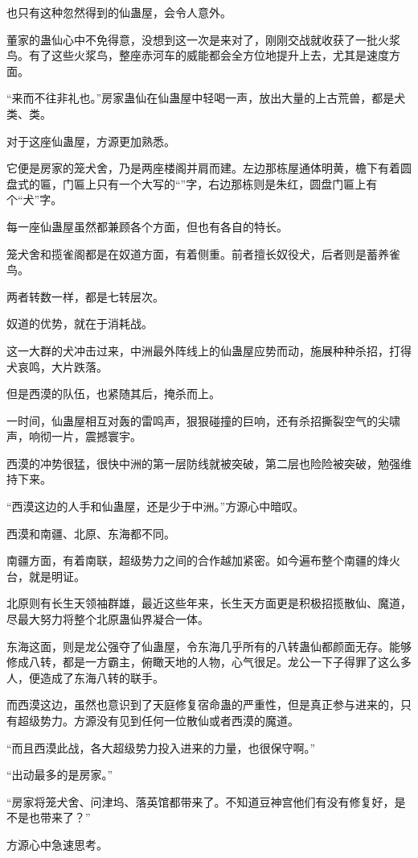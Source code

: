 \begin{this_body}
也只有这种忽然得到的仙蛊屋，会令人意外。

董家的蛊仙心中不免得意，没想到这一次是来对了，刚刚交战就收获了一批火浆鸟。有了这些火浆鸟，整座赤河车的威能都会全方位地提升上去，尤其是速度方面。

“来而不往非礼也。”房家蛊仙在仙蛊屋中轻喝一声，放出大量的上古荒兽，都是犬类、类。

对于这座仙蛊屋，方源更加熟悉。

它便是房家的笼犬舍，乃是两座楼阁并肩而建。左边那栋屋通体明黄，檐下有着圆盘式的匾，门匾上只有一个大写的“”字，右边那栋则是朱红，圆盘门匾上有个“犬”字。

每一座仙蛊屋虽然都兼顾各个方面，但也有各自的特长。

笼犬舍和揽雀阁都是在奴道方面，有着侧重。前者擅长奴役犬，后者则是蓄养雀鸟。

两者转数一样，都是七转层次。

奴道的优势，就在于消耗战。

这一大群的犬冲击过来，中洲最外阵线上的仙蛊屋应势而动，施展种种杀招，打得犬哀鸣，大片跌落。

但是西漠的队伍，也紧随其后，掩杀而上。

一时间，仙蛊屋相互对轰的雷鸣声，狠狠碰撞的巨响，还有杀招撕裂空气的尖啸声，响彻一片，震撼寰宇。

西漠的冲势很猛，很快中洲的第一层防线就被突破，第二层也险险被突破，勉强维持下来。

“西漠这边的人手和仙蛊屋，还是少于中洲。”方源心中暗叹。

西漠和南疆、北原、东海都不同。

南疆方面，有着南联，超级势力之间的合作越加紧密。如今遍布整个南疆的烽火台，就是明证。

北原则有长生天领袖群雄，最近这些年来，长生天方面更是积极招揽散仙、魔道，尽最大努力将整个北原蛊仙界凝合一体。

东海这面，则是龙公强夺了仙蛊屋，令东海几乎所有的八转蛊仙都颜面无存。能够修成八转，都是一方霸主，俯瞰天地的人物，心气很足。龙公一下子得罪了这么多人，便造成了东海八转的联手。

而西漠这边，虽然也意识到了天庭修复宿命蛊的严重性，但是真正参与进来的，只有超级势力。方源没有见到任何一位散仙或者西漠的魔道。

“而且西漠此战，各大超级势力投入进来的力量，也很保守啊。”

“出动最多的是房家。”

“房家将笼犬舍、问津坞、落英馆都带来了。不知道豆神宫他们有没有修复好，是不是也带来了？”

方源心中急速思考。


\end{this_body}
